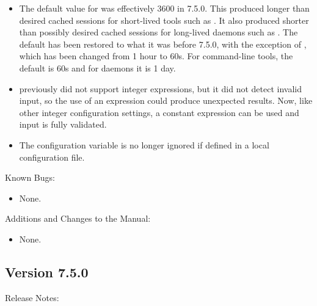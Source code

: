 \begin{itemize}

\item The default value for 
  was effectively 3600 in 7.5.0.  This produced longer than desired
  cached sessions for short-lived tools such as .  It
  also produced shorter than possibly desired cached sessions for
  long-lived daemons such as .  The default has been
  restored to what it was before 7.5.0, with the exception of
  , which has been changed from 1 hour to 60s.  For
  command-line tools, the default is 60s and for daemons it is 1 day.

\item {} previously did
  not support integer expressions, but it did not detect invalid
  input, so the use of an expression could produce unexpected results.
  Now, like other integer configuration settings, a constant expression can
  be used and input is fully validated.

\item The configuration variable  is no longer
ignored if defined in a local configuration file.

\end{itemize}

\noindent Known Bugs:

\begin{itemize}

\item None.

\end{itemize}

\noindent Additions and Changes to the Manual:

\begin{itemize}

\item None.

\end{itemize}


\subsection*{\label{sec:New-7-5-0}Version 7.5.0}

\noindent Release Notes:

